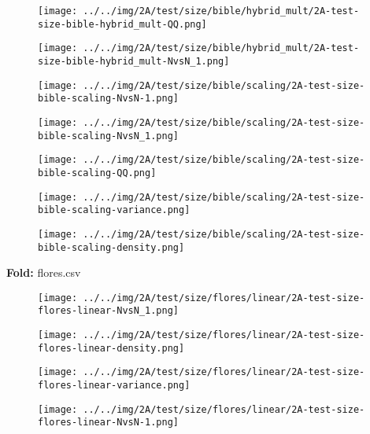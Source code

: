 \begin{figure}[H]
\centering	\texttt{[image: ../../img/2A/test/size/bible/hybrid\_mult/2A-test-size-bible-hybrid\_mult-QQ.png]}
\end{figure}
\begin{figure}[H]
\centering	\texttt{[image: ../../img/2A/test/size/bible/hybrid\_mult/2A-test-size-bible-hybrid\_mult-NvsN\_1.png]}
\end{figure}
\begin{figure}[H]
\centering	\texttt{[image: ../../img/2A/test/size/bible/scaling/2A-test-size-bible-scaling-NvsN-1.png]}
\end{figure}
\begin{figure}[H]
\centering	\texttt{[image: ../../img/2A/test/size/bible/scaling/2A-test-size-bible-scaling-NvsN\_1.png]}
\end{figure}
\begin{figure}[H]
\centering	\texttt{[image: ../../img/2A/test/size/bible/scaling/2A-test-size-bible-scaling-QQ.png]}
\end{figure}
\begin{figure}[H]
\centering	\texttt{[image: ../../img/2A/test/size/bible/scaling/2A-test-size-bible-scaling-variance.png]}
\end{figure}
\begin{figure}[H]
\centering	\texttt{[image: ../../img/2A/test/size/bible/scaling/2A-test-size-bible-scaling-density.png]}
\end{figure}
\textbf{Fold:} flores.csv
\begin{figure}[H]
\centering	\texttt{[image: ../../img/2A/test/size/flores/linear/2A-test-size-flores-linear-NvsN\_1.png]}
\end{figure}
\begin{figure}[H]
\centering	\texttt{[image: ../../img/2A/test/size/flores/linear/2A-test-size-flores-linear-density.png]}
\end{figure}
\begin{figure}[H]
\centering	\texttt{[image: ../../img/2A/test/size/flores/linear/2A-test-size-flores-linear-variance.png]}
\end{figure}
\begin{figure}[H]
\centering	\texttt{[image: ../../img/2A/test/size/flores/linear/2A-test-size-flores-linear-NvsN-1.png]}
\end{figure}
